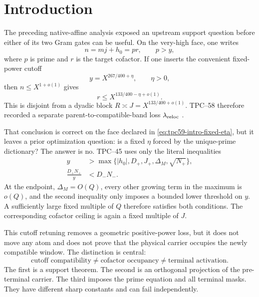 \section{Introduction}
\label{sec:tpc59-introduction}

The preceding native-affine analysis exposed an upstream support question
before either of its two Gram gates can be useful.  On the very-high face,
one writes
\begin{equation}
 n=mj+h_0=pr,
 \qquad p>y,
 \label{eq:tpc59-intro-terminal-equation}
\end{equation}
where \(p\) is prime and \(r\) is the target cofactor.  If one inserts the
convenient fixed-power cutoff
\begin{equation}
 y=X^{267/400+\eta},
 \qquad \eta>0,
 \label{eq:tpc59-intro-fixed-eta}
\end{equation}
then \(n\le X^{1+o(1)}\) gives
\begin{equation}
 r\le X^{133/400-\eta+o(1)}.
 \label{eq:tpc59-intro-small-r}
\end{equation}
This is disjoint from a dyadic block
\(R\asymp J=X^{133/400+o(1)}\).  TPC--58 therefore recorded a separate
parent-to-compatible-band loss \(\lambda_{\rm reloc}\)
\citep{WangTPC58}.

That conclusion is correct on the face declared in
\eqref{eq:tpc59-intro-fixed-eta}, but it leaves a prior optimization
question: is a fixed \(\eta\) forced by the unique-prime dictionary?  The
answer is no.  TPC--45 uses only the literal inequalities
\begin{align}
 y&>\max\{|h_0|,D_+,J_+,\Delta_M,\sqrt{N_+}\},
 \label{eq:tpc59-intro-cutoff-geometry}\\
 \frac{D_+N_+}{y}&<D_-N_-.
 \label{eq:tpc59-intro-cutoff-separation}
\end{align}
At the endpoint, \(\Delta_M=O(Q)\), every other growing term in the maximum
is \(o(Q)\), and the second inequality only imposes a bounded lower
threshold on \(y\).  A sufficiently large fixed multiple of \(Q\) therefore
satisfies both conditions.  The corresponding cofactor ceiling is again a
fixed multiple of \(J\).

This cutoff retuning removes a geometric positive-power loss, but it does
not move any atom and does not prove that the physical carrier occupies the
newly compatible window.  The distinction is central:
\begin{equation}
 \boxed{
 \text{cutoff compatibility}\ne
 \text{cofactor occupancy}\ne
 \text{terminal activation}.}
 \label{eq:tpc59-three-gates}
\end{equation}
The first is a support theorem.  The second is an orthogonal projection of
the pre-terminal carrier.  The third imposes the prime equation and all
terminal masks.  They have different sharp constants and can fail
independently.

